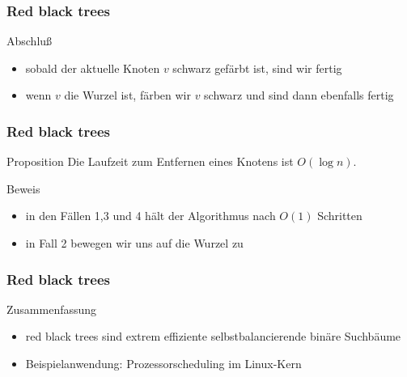 \documentclass[aspectratio=1610, 11pt]{beamer}
\newcommand{\mytitle}{Red black trees}
\begin{document}
\begin{frame}\frametitle{\mytitle}
	\begin{exampleblock}{Abschlu\ss}
		\begin{itemize}
			\item sobald der aktuelle Knoten $v$ schwarz gef\"arbt ist, sind wir fertig
			\item wenn $v$ die Wurzel ist, f\"arben wir $v$ schwarz und sind dann ebenfalls fertig
		\end{itemize}
	\end{exampleblock}
\end{frame}

\begin{frame}\frametitle{\mytitle}
	\begin{block}{Proposition}
		Die Laufzeit zum Entfernen eines Knotens ist $O(\log n)$.
	\end{block}
	\begin{exampleblock}{Beweis}
		\begin{itemize}
			\item in den F\"allen 1,3 und 4 h\"alt der Algorithmus nach $O(1)$ Schritten
			\item in Fall 2 bewegen wir uns auf die Wurzel zu
		\end{itemize}
	\end{exampleblock}
\end{frame}

\begin{frame}\frametitle{\mytitle}
	\begin{exampleblock}{Zusammenfassung}
		\begin{itemize}
			\item red black trees sind extrem effiziente selbstbalancierende bin\"are Suchb\"aume
			\item \alert{Beispielanwendung:} Prozessorscheduling im Linux-Kern
		\end{itemize}
	\end{exampleblock}
\end{frame}
\end{document}
